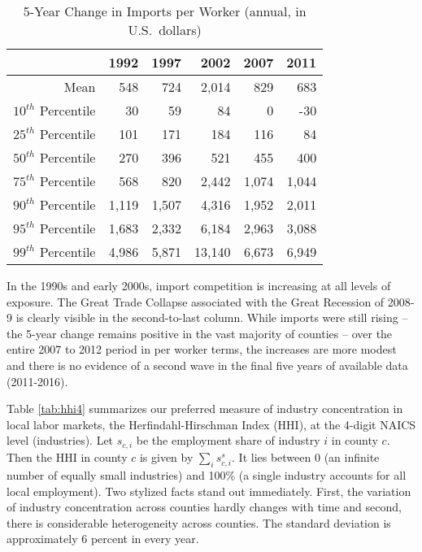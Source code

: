 \documentclass[onehalfspacing,11pt]{article}
\begin{document}
\begin{table}
  \centering 
  

  \begin{tabular*}{.85\textwidth}{@{\extracolsep{\fill}} rrrrrr}
\toprule
& 1992 & 1997 & 2002 & 2007 & 2011 \\
\midrule
Mean   & 548 & 724 & 2,014 & 829 & 683 \\
$10^{th}$ Percentile   & 30 & 59 & 84 & 0 & -30 \\
$25^{th}$ Percentile   & 101& 171 & 184 & 116 & 84\\
$50^{th}$ Percentile   & 270 & 396 & 521 & 455 & 400\\
$75^{th}$ Percentile   & 568 & 820 & 2,442 & 1,074 & 1,044\\
$90^{th}$ Percentile   & 1,119 & 1,507 & 4,316 & 1,952 & 2,011\\
$95^{th}$ Percentile   & 1,683 & 2,332 & 6,184 & 2,963 & 3,088\\
$99^{th}$ Percentile   & 4,986 & 5,871 & 13,140 & 6,673 & 6,949\\
\bottomrule
\end{tabular*}
  \caption{5-Year Change in Imports per Worker (annual, in U.S.~dollars)}\label{tab:d5ipw}
\end{table}

In the 1990s and early 2000s, import competition is increasing at all levels of exposure. The Great Trade Collapse associated with the Great Recession of 2008-9 is clearly visible in the second-to-last column. While imports were still rising -- the 5-year change remains positive in the vast majority of counties -- over the entire 2007 to 2012 period in per worker terms, the increases are more modest and there is no evidence of a second wave in the final five years of available data (2011-2016).

Table \ref{tab:hhi4} summarizes our preferred measure of industry concentration in local labor markets, the Herfindahl-Hirschman Index (HHI), at the 4-digit NAICS level (industries). Let $s_{c,i}$ be the employment share of industry $i$ in county $c$. Then the HHI in county $c$ is given by $\sum_i s_{c,i}^s$. It lies between 0 (an infinite number of equally small industries) and 100\% (a single industry accounts for all local employment). Two stylized facts stand out immediately. First, the variation of industry concentration across counties hardly changes with time and second, there is considerable heterogeneity across counties. The standard deviation is approximately 6 percent in every year.
\end{document}
